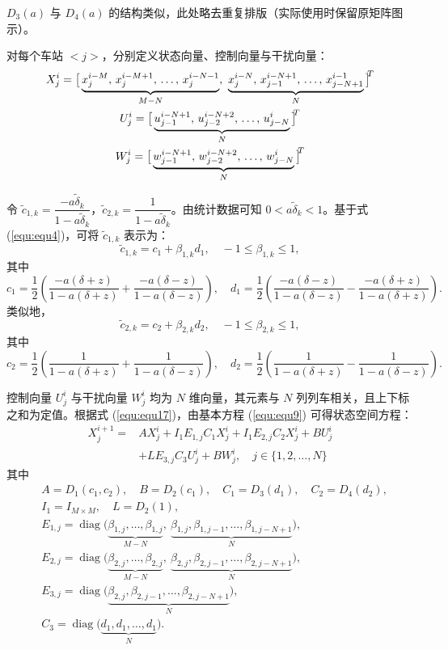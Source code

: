$D_{3}(a)$ 与 $D_{4}(a)$ 的结构类似，此处略去重复排版（实际使用时保留原矩阵图示）。

对每个车站 $<j>$，分别定义状态向量、控制向量与干扰向量：
\begin{gather}
    X_{j}^{i} = \big[ \underbrace{x_{j}^{i-M},\, x_{j}^{i-M+1},\, \dots,\, x_{j}^{i-N-1}}_{M-N},\ 
    \underbrace{x_{j}^{i-N},\, x_{j-1}^{i-N+1},\, \dots,\, x_{j-N+1}^{i-1}}_{N} \big]^{\!\!T} \notag \\ 
    U_{j}^{i} = \big[ \underbrace{u_{j-1}^{i-N+1},\, u_{j-2}^{i-N+2},\, \dots,\, u_{j-N}^{i}}_{N} \big]^{\!\!T} \notag \\ 
    W_{j}^{i} = \big[ \underbrace{w_{j-1}^{i-N+1},\, w_{j-2}^{i-N+2},\, \dots,\, w_{j-N}^{i}}_{N} \big]^{\!\!T}
    \label{equ:equ17}
\end{gather}

令 $\tilde{c}_{1,k} = \dfrac{-a\tilde{\delta}_k}{1 - a\tilde{\delta}_k}$，$\tilde{c}_{2,k} = \dfrac{1}{1 - a\tilde{\delta}_k}$。由统计数据可知 $0 < a \tilde{\delta}_{k} < 1$。基于式 (\ref{equ:equ4})，可将 $\tilde{c}_{1,k}$ 表示为：
\[
\tilde{c}_{1,k} = c_1 + \beta_{1,k} d_1, \quad -1 \leq \beta_{1,k} \leq 1,
\]
其中
\[
c_{1} = \frac{1}{2} \left( \frac{-a(\delta+z)}{1-a(\delta+z)} + \frac{-a(\delta-z)}{1-a(\delta-z)} \right), \quad
d_1 = \frac{1}{2} \left( \frac{-a(\delta-z)}{1-a(\delta-z)} - \frac{-a(\delta+z)}{1-a(\delta+z)} \right).
\]
类似地，
\[
\tilde{c}_{2,k} = c_2 + \beta_{2,k} d_2, \quad -1 \leq \beta_{2,k} \leq 1,
\]
其中
\[
c_{2} = \frac{1}{2} \left( \frac{1}{1-a(\delta+z)} + \frac{1}{1-a(\delta-z)} \right), \quad
d_2 = \frac{1}{2} \left( \frac{1}{1-a(\delta+z)} - \frac{1}{1-a(\delta-z)} \right).
\]

控制向量 $U_{j}^i$ 与干扰向量 $W_{j}^i$ 均为 $N$ 维向量，其元素与 $N$ 列列车相关，且上下标之和为定值。根据式 (\ref{equ:equ17})，由基本方程 (\ref{equ:equ9}) 可得状态空间方程：
\begin{equation}
\label{stateequation}
\begin{aligned}
X_{j}^{i+1} ={}& A X_{j}^{i} + I_{1} E_{1, j} C_{1} X_{j}^{i} + I_{1} E_{2, j} C_{2} X_{j}^{i} + B U_{j}^{i} \\
& + L E_{3, j} C_{3} U_{j}^{i} + B W_{j}^{i}, \quad j \in \{1,2, \ldots, N\}
\end{aligned}
\end{equation}
其中
\begin{align*}
&A = D_{1}(c_1, c_2), \quad B = D_{2}(c_1), \quad C_1 = D_3(d_1), \quad C_2 = D_4(d_2), \\
&I_{1} = I_{M \times M}, \quad L = D_2(1), \\
&E_{1,j} = \operatorname{diag}\big( \underbrace{\beta_{1,j}, \dots, \beta_{1,j}}_{M-N},\ \underbrace{\beta_{1,j}, \beta_{1,j-1}, \dots, \beta_{1,j-N+1}}_{N} \big), \\
&E_{2,j} = \operatorname{diag}\big( \underbrace{\beta_{2,j}, \dots, \beta_{2,j}}_{M-N},\ \underbrace{\beta_{2,j}, \beta_{2,j-1}, \dots, \beta_{2,j-N+1}}_{N} \big), \\
&E_{3,j} = \operatorname{diag}\big( \underbrace{\beta_{2,j}, \beta_{2,j-1}, \dots, \beta_{2,j-N+1}}_{N} \big), \\
&C_{3} = \operatorname{diag}\big( \underbrace{d_1, d_1, \dots, d_1}_{N} \big).
\end{align*}

